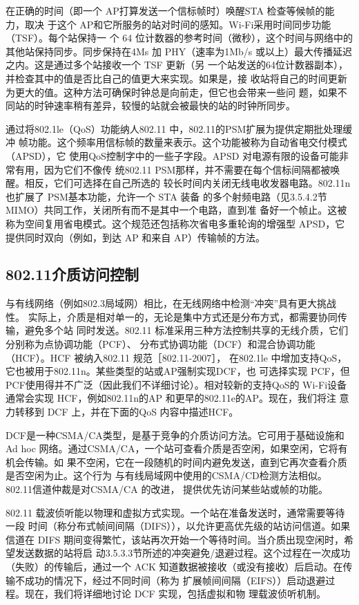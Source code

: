 在正确的时间（即一个 AP打算发送一个信标帧时）唤醒STA 检查等候帧的能力，取决
于这个 AP和它所服务的站对时间的感知。Wi-Fi采用时间同步功能（TSF）。每个站保持一
个 64 位计数器的参考时间（微秒），这个时间与网络中的其他站保持同步。同步保持在4Ms
加 PHY（速率为1Mb/s 或以上）最大传播延迟之内。这是通过多个站接收一个 TSF 更新（另
一个站发送的64位计数器副本），并检查其中的值是否比自己的值更大来实现。如果是，接
收站将自己的时间更新为更大的值。这种方法可确保时钟总是向前走，但它也会带来一些问
题，如果不同站的时钟速率稍有差异，较慢的站就会被最快的站的时钟所同步。

通过将802.1le（QoS）功能纳人802.11 中，802.11的PSM扩展为提供定期批处理缓冲
帧功能。这个频率用信标帧的数量来表示。这个功能被称为自动省电交付模式（APSD），它
使用QoS控制字中的一些子字段。APSD 对电源有限的设备可能非常有用，因为它们不像传
统802.11 PSM那样，并不需要在每个信标间隔都被唤醒。相反，它们可选择在自己所选的
较长时间内关闭无线电收发器电路。802.11n 也扩展了 PSM基本功能，允许一个 STA 装备
的多个射频电路（见3.5.4.2节 MIMO）共同工作，关闭所有而不是其中一个电路，直到准
备好一个帧止。这被称为空间复用省电模式。这个规范还包括称次省电多重轮询的增强型
APSD，它提供同时双向（例如，到达 AP 和来自 AP）传输帧的方法。

\subsection{802.11介质访问控制}

与有线网络（例如802.3局域网）相比，在无线网络中检测“冲突”具有更大挑战性。
实际上，介质是相对单一的，无论是集中方式还是分布方式，都需要协同传输，避免多个站
同时发送。802.11 标准采用三种方法控制共享的无线介质，它们分别称为点协调功能（PCF）、
分布式协调功能（DCF）和混合协调功能（HCF）。HCF 被纳入802.11 规范［802.11-2007］，
在802.1le 中增加支持QoS，它也被用于802.11n。某些类型的站或AP强制实现DCF，也
可选择实现 PCF，但PCF使用得并不广泛（因此我们不详细讨论）。相对较新的支持QoS的
Wi-Fi设备通常会实现 HCF，例如802.11n的AP 和更早的802.11e的AP。现在，我们将注
意力转移到 DCF 上，并在下面的QoS 内容中描述HCF。

DCF是一种CSMA/CA类型，是基于竞争的介质访问方法。它可用于基础设施和Ad
hoc 网络。通过CSMA/CA，一个站可查看介质是否空闲，如果空闲，它将有机会传输。如
果不空闲，它在一段随机的时间内避免发送，直到它再次查看介质是否空闲为止。这个行为
与有线局域网中使用的CSMA/CD检测方法相似。802.11信道仲裁是对CSMA/CA 的改进，
提供优先访问某些站或帧的功能。

802.11 载波侦听能以物理和虚拟方式实现。一个站在准备发送时，通常需要等待一段
时间（称分布式帧间间隔（DIFS）），以允许更高优先级的站访问信道。如果信道在 DIFS
期间变得繁忙，该站再次开始一个等待时间。当介质出现空闲时，希望发送数据的站将启
动3.5.3.3节所述的冲突避免/退避过程。这个过程在一次成功（失败）的传输后，通过一个
ACK 知道数据被接收（或没有接收）后启动。在传输不成功的情况下，经过不同时间（称为
扩展帧间间隔（EIFS））启动退避过程。现在，我们将详细地讨论 DCF 实现，包括虚拟和物
理载波侦听机制。


